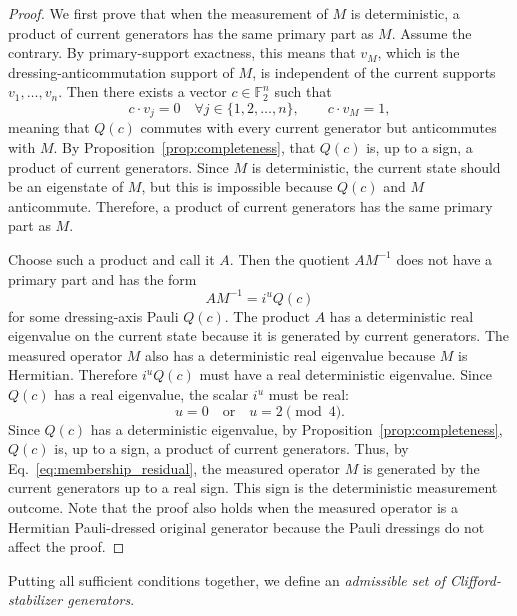 \documentclass[
 reprint,
 amsmath,amssymb,
 pra,superscriptaddress, nofootinbib
]{revtex4-2}
\theoremstyle{definition}
\theoremstyle{plain}
\begin{document}
\begin{proof}
We first prove that when the measurement of $M$ is deterministic, a product of current generators has the same primary part as $M$. Assume the contrary. By primary-support exactness, this means that $v_M$, which is the dressing-anticommutation support of $M$, is independent of the current supports $v_1,\ldots,v_n$. 
Then there exists a vector $c\in\mathbb{F}_2^n$ such that
\begin{equation}
  c\cdot v_j=0 \quad \forall j \in \{1,2,\ldots,n\},
  \qquad
  c\cdot v_M=1,
\end{equation}
meaning that $Q(c)$ commutes with every current generator but anticommutes with $M$. By Proposition~\ref{prop:completeness}, that $Q(c)$ is, up to a sign, a product of current generators.
Since $M$ is deterministic, the current state should be an eigenstate of $M$, but this is impossible because $Q(c)$ and $M$ anticommute. Therefore, a product of current generators has the same primary part as $M$.

Choose such a product and call it $A$. Then the quotient $AM^{-1}$ does not have a primary part and has the form
\begin{equation}
  AM^{-1}=i^u Q(c)
  \label{eq:membership_residual}
\end{equation}
for some dressing-axis Pauli $Q(c)$. The product $A$ has a deterministic real eigenvalue on the current state because it is generated by current generators. The measured operator $M$ also has a deterministic real eigenvalue because $M$ is Hermitian. Therefore $i^uQ(c)$ must have a real deterministic eigenvalue. Since $Q(c)$ has a real eigenvalue, the scalar $i^u$ must be real:
\begin{equation}
  u=0\quad\text{or}\quad u=2\pmod4.
\end{equation}
Since $Q(c)$ has a deterministic eigenvalue, by Proposition~\ref{prop:completeness}, $Q(c)$ is, up to a sign, a product of current generators. Thus, by Eq.~\eqref{eq:membership_residual}, the measured operator $M$ is generated by the current generators up to a real sign. This sign is the deterministic measurement outcome.
Note that the proof also holds when the measured operator is a Hermitian Pauli-dressed original generator because the Pauli dressings do not affect the proof.
\end{proof}

Putting all sufficient conditions together, we define an \emph{admissible set of Clifford-stabilizer generators}.
\end{document}
